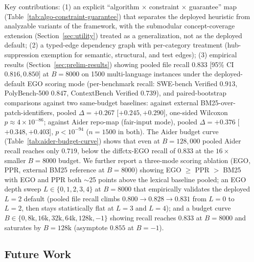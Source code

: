 \documentclass[11pt, a4paper]{article}
\begin{document}
Key contributions: (1) an explicit ``algorithm $\times$ constraint $\times$ guarantee'' map (Table~\ref{tab:algo-constraint-guarantee}) that separates the deployed heuristic from analyzable variants of the framework, with the submodular concept-coverage extension (Section~\ref{sec:utility}) treated as a generalization, not as the deployed default; (2) a typed-edge dependency graph with per-category treatment (hub-suppression exemption for semantic, structural, and test edges); (3) empirical results (Section~\ref{sec:prelim-results}) showing pooled file recall $0.833$ [95\% CI $0.816, 0.850$] at $B{=}8000$ on 1500 multi-language instances under the deployed-default EGO scoring mode (per-benchmark recall: SWE-bench Verified $0.913$, PolyBench-500 $0.847$, ContextBench Verified $0.739$), and paired-bootstrap comparisons against two same-budget baselines: against external BM25-over-patch-identifiers, pooled $\Delta = +0.267$ [$+0.245, +0.290$], one-sided Wilcoxon $p \approx 4 \times 10^{-86}$; against Aider repo-map (fair-input mode), pooled $\Delta = +0.376$ [$+0.348, +0.403$], $p < 10^{-94}$ ($n{=}1500$ in both). The Aider budget curve (Table~\ref{tab:aider-budget-curve}) shows that even at $B{=}128{,}000$ pooled Aider recall reaches only $0.719$, below the diffctx-EGO recall of $0.833$ at the $16\times$ smaller $B{=}8000$ budget. We further report a three-mode scoring ablation (EGO, PPR, external BM25 reference at $B{=}8000$) showing EGO $\geq$ PPR $>$ BM25 with EGO and PPR both $\sim$25 points above the lexical baseline pooled; an EGO depth sweep $L \in \{0,1,2,3,4\}$ at $B{=}8000$ that empirically validates the deployed $L{=}2$ default (pooled file recall climbs $0.800 \to 0.828 \to 0.831$ from $L{=}0$ to $L{=}2$, then stays statistically flat at $L{=}3$ and $L{=}4$); and a budget curve $B \in \{0, 8\mathrm{k}, 16\mathrm{k}, 32\mathrm{k}, 64\mathrm{k}, 128\mathrm{k}, -1\}$ showing recall reaches $0.833$ at $B{=}8000$ and saturates by $B{=}128\mathrm{k}$ (asymptote $0.855$ at $B{=}{-1}$).

\subsection{Future Work}
\label{sec:future-work}
\end{document}
